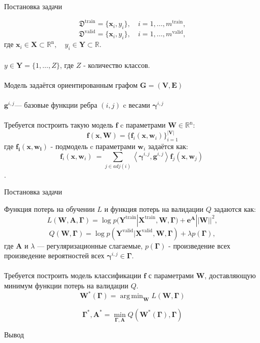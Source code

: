 \documentclass[10pt]{beamer}
\DeclareMathOperator*{\argmin}{arg\,min}
\begin{document}
\begin{frame}{Постановка задачи}

\[
\mathfrak{D}^{\text{train}} = \{\mathbf{x}_i, y_i\}, \quad i=1,\dots,m^{\text{train}},
\]
\[
\mathfrak{D}^{\text{valid}} = \{\mathbf{x}_i, y_i\}, \quad i=1,\dots,m^{\text{valid}},
\]
 где $\mathbf{x}_i\in\mathbf{X}\subset\mathbb{R}^{\text{n}},\quad y_i\in\mathbf{Y}\subset\mathbb{R}.$\\
~\\
$y\in\mathbf{Y}= \{1,\dots,Z\}$, где $Z$ - количество классов.\\
~\\
Модель задаётся ориентированным графом $\mathbf{G=(V,E)}$\\
~\\
$\mathbf{g}^{i,j} $--- базовые функции ребра $(i, j) $ c весами $\boldsymbol{\gamma}^{i,j}$\\
~\\
Требуется построить такую модель $\mathbf{f}$ c параметрами $\mathbf{W}\in\mathbb{R}^\text{n}$:
\[
\mathbf{f}(\mathbf{x}, \mathbf{W})= \{ \mathbf{f}_i(\mathbf{x}, \mathbf{w}_i)\}_{i=1}^\mathbf{|V|}
\]
где $\mathbf{f_i(x, w_i)}$ - подмодель c параметрами $\mathbf{w}_i$ задаётся как:
\[
\mathbf{f}_i(\mathbf{x}, \mathbf{w}_i)\ = \sum_{j\in adj(i)} \left\langle {\boldsymbol{\gamma}^{i,j}, \mathbf{g}^{i,j}} \right\rangle \mathbf{f}_j(\mathbf{x}, \mathbf{w}_j)\
\].


\end{frame}


\begin{frame}{Постановка задачи}

Функция потерь на обучении $L$ и функция потерь на валидации $Q$ задаются как:
\[
L (\mathbf{W}, \mathbf{A}, \boldsymbol{\Gamma})= \log p(\mathbf{Y}^\text{train}|\mathbf{X}^\text{train}, \mathbf{W}, \boldsymbol{\Gamma}) + \boldsymbol{e}^{\mathbf{A}}||\mathbf{W}||^2,
\]
\[
Q (\mathbf{W}, \boldsymbol{\Gamma})= \log p(\mathbf{Y}^\text{valid}|\mathbf{X}^\text{valid}, \mathbf{W}, \boldsymbol{\Gamma}) + \lambda p(\boldsymbol{\Gamma}),
\]
где $\mathbf{A}$ и $\lambda$ --- регуляризационные слагаемые, $p(\boldsymbol{\Gamma})$ - произведение всех произведение вероятностей всех $\boldsymbol{\gamma}^{i,j} \in \boldsymbol{\Gamma}$. \\
~\\
Требуется построить модель классификации $\mathbf{f}$ с параметрами $\mathbf{W}$, доставляющую минимум функции потерь на валидации $Q$.
\[
\mathbf{W}^*( \boldsymbol{\Gamma}) = \argmin_{\mathbf{W}}
L (\mathbf{W}, \boldsymbol{\Gamma})\]

\[
\boldsymbol{\Gamma}^*, \mathbf{A}^* = \min_{\boldsymbol{\Gamma}, \mathbf{A}} Q (\mathbf{W}^*( \boldsymbol{\Gamma}), \boldsymbol{\Gamma})
\]



\end{frame}




\begin{frame}{Вывод}



\end{frame}
\end{document}
